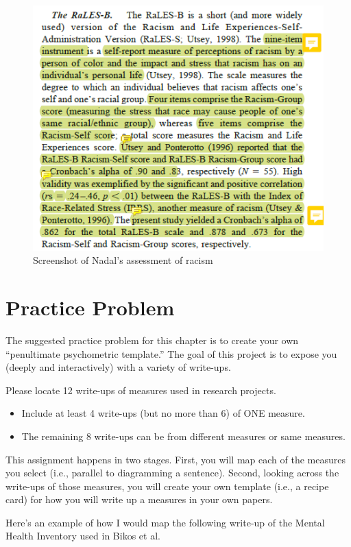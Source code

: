 \documentclass[
  english,
]{book}
\providecommand{\tightlist}{%
  \setlength{\itemsep}{0pt}\setlength{\parskip}{0pt}}
\begin{document}
\begin{figure}
\centering
\includegraphics{images/PsychoM/Nadal1.png}
\caption{Screenshot of Nadal's assessment of racism}
\end{figure}

\hypertarget{practice-problem}{%
\section{Practice Problem}\label{practice-problem}}

The suggested practice problem for this chapter is to create your own ``penultimate psychometric template.'' The goal of this project is to expose you (deeply and interactively) with a variety of write-ups.

Please locate 12 write-ups of measures used in research projects.

\begin{itemize}
\tightlist
\item
  Include at least 4 write-ups (but no more than 6) of ONE measure.
\item
  The remaining 8 write-ups can be from different measures or same measures.
\end{itemize}

This assignment happens in two stages. First, you will map each of the measures you select (i.e., parallel to diagramming a sentence). Second, looking across the write-ups of those measures, you will create your own template (i.e., a recipe card) for how you will write up a measures in your own papers.

Here's an example of how I would map the following write-up of the Mental Health Inventory used in Bikos et al.~\citeyearpar{bikos_repeated_2007}
\end{document}
